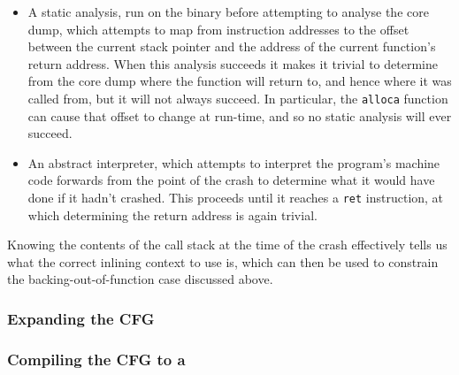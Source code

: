 \begin{itemize}
\item
  A static analysis, run on the binary before attempting to analyse
  the core dump, which attempts to map from instruction addresses to
  the offset between the current stack pointer and the address of the
  current function's return address.  When this analysis succeeds it
  makes it trivial to determine from the core dump where the function
  will return to, and hence where it was called from, but it will not
  always succeed.  In particular, the \verb|alloca| function can cause
  that offset to change at run-time, and so no static analysis will
  ever succeed.
\item
  An abstract interpreter, which attempts to interpret the program's
  machine code forwards from the point of the crash to determine what
  it would have done if it hadn't crashed.  This proceeds until it
  reaches a \verb|ret| instruction, at which determining the return
  address is again trivial.
\end{itemize}


Knowing the contents of the call stack at the time of the crash
effectively tells us what the correct inlining context to use is,
which can then be used to constrain the backing-out-of-function case
discussed above.

\subsubsection{Expanding the CFG}
\label{sect:derive:benefits_of_longer_fragments}


\subsubsection{Compiling the CFG to a \StateMachine}
\label{sect:derive:compile_cfg}


